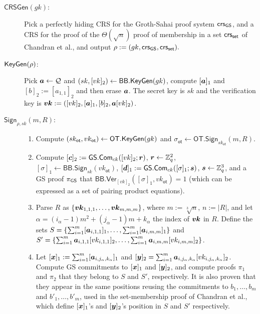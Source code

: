 \begin{description}
\item[$\mathsf{CRSGen}(gk)$:] Pick a perfectly hiding CRS for the Groth-Sahai proof system $\mathsf{crs}_{\mathsf{GS}}$, and a CRS for the proof of the $\Theta(\sqrt{n})$ proof of membership in a set $\mathsf{crs}_{\mathsf{set}}$ of Chandran et al., and output $\rho:=(gk,\mathsf{crs}_{\mathsf{GS}},\mathsf{crs}_{\mathsf{set}}).$
\item[$\mathsf{KeyGen}(\rho)$:] Pick ${\boldsymbol{a}}\gets\mathcal{Q}$ and $(sk,[vk]_2)\gets\mathsf{BB}.\mathsf{KeyGen}(gk)$, compute $[{\boldsymbol{a}}]_1$ and $[b]_2 := [a_{1,1}]_2$ and then erase ${\boldsymbol{a}}$. The secret key is $sk$ and the verification key is ${\boldsymbol{vk}}:=([vk]_2,[{\boldsymbol{a}}]_1,[b]_2,{\boldsymbol{a}}[vk]_2)$.
\item[$\mathsf{Sign}_{\rho,sk}(m,R)$:]
\begin{enumerate}
\item Compute $(sk_\mathsf{ot},vk_\mathsf{ot})\gets\mathsf{OT}.\mathsf{KeyGen}(gk)$ and $\sigma_\mathsf{ot}\gets\allowbreak\mathsf{OT}.\allowbreak\mathsf{Sign}_{sk_\mathsf{ot}}(m,R)$.
\item Compute $[{\boldsymbol{c}}]_2:={\mathsf{GS}}.\mathsf{Com}_{ck}([vk]_2;{\boldsymbol{r}})$, ${\boldsymbol{r}}\gets\mathbb{Z}_q^2$, $[\sigma]_1\gets\mathsf{BB}.\mathsf{Sign}_{sk}(vk_\mathsf{ot})$, $[{\boldsymbol{d}}]_1:={\mathsf{GS}}.\mathsf{Com}_{ck}([\sigma]_1;{\boldsymbol{s}})$, ${\boldsymbol{s}}\gets\mathbb{Z}_q^3$, and a GS proof $\pi_{\mathsf{GS}}$ that $\mathsf{BB}.\mathsf{Ver}_{[vk]_2}(\allowbreak[\sigma]_1,vk_\mathsf{ot})=1$ (which can be expressed as a set of pairing product equations).
\item Parse $R$ as $\{{\boldsymbol{vk}}_{1,1,1},\ldots,{\boldsymbol{vk}}_{m,m,m}\}$, where $m:=\sqrt[3]{n}$, $n:=|R|$, and let $\alpha=(i_\alpha-1)m^2+(j_\alpha-1)m +k_\alpha$ the index of ${\boldsymbol{vk}}$ in $R$. Define the sets $S=\{\sum_{i=1}^{m}[{\boldsymbol{a}}_{i,1,1}]_1,\allowbreak\ldots,\sum_{i=1}^{m}[{\boldsymbol{a}}_{i,m,m}]_1\}$ and\\ $S'=\{\sum_{i=1}^{m}{\boldsymbol{a}}_{i,1,1}[vk_{i,1,1}]_2,\allowbreak\ldots,\sum_{i=1}^{m}{\boldsymbol{a}}_{i,m,m}[vk_{i,m,m}]_2\}$.
\item Let $[{\boldsymbol{x}}]_1:=\sum_{i=1}^{m}[{\boldsymbol{a}}_{i,j_\alpha,k_\alpha}]_1$ and $[{\boldsymbol{y}}]_2=\sum_{i=1}^{m}{\boldsymbol{a}}_{i,j_\alpha,k_\alpha}[vk_{i,j_\alpha,k_\alpha}]_2$. Compute GS commitments to $[{\boldsymbol{x}}]_1$ and $[{\boldsymbol{y}}]_2$, and compute proofs $\pi_1$ and $\pi_2$ that they belong to $S$ and $S'$, respectively. It is also proven that they appear in the same positions reusing the commitments to $b_1,\ldots,b_{m}$ and $b'_1,\ldots,b'_{m}$, used in the set-membership proof of Chandran et al., which define $[{\boldsymbol{x}}]_1$'s and $[{\boldsymbol{y}}]_2$'s position in $S$ and $S'$ respectively.

\end{enumerate}
\end{description}
